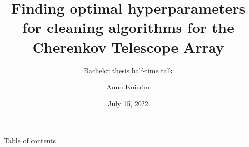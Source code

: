 

\ifdefined\darktheme
\else
\fi



\title{Finding optimal hyperparameters for cleaning algorithms for the Cherenkov Telescope Array}
\subtitle{Bachelor thesis half-time talk}
\author[A.~Knierim]{Anno Knierim}
\date{July 15, 2022}




\maketitle

\begin{frame}{Table of contents}
  \tableofcontents
\end{frame}

